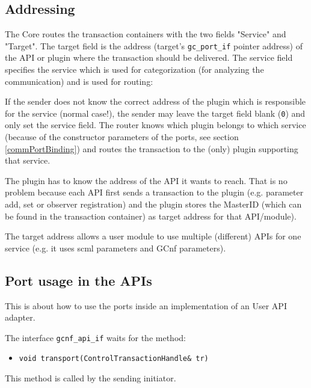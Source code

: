 \subsection{Addressing}
\label{commAddressing}
The \GreenControl Core routes the transaction containers with the two fields "Service" and "Target". The target field is the address (target's \lstinline|gc_port_if| pointer address) of the API or plugin where the transaction should be delivered. The service field specifies the service which is used for categorization (for analyzing the communication) and is used for routing:  

If the sender does not know the correct address of the plugin which is responsible for the service (normal case!), the sender may leave the target field blank (\lstinline|0|) and only set the service field. The router knows which plugin belongs to which service (because of the constructor parameters of the ports, see section \ref{commPortBinding}) and routes the transaction to the (only) plugin supporting that service. 

The plugin has to know the address of the API it wants to reach. That is no problem because each API first sends a transaction to the plugin (e.g. parameter add, set or observer registration) and the plugin stores the MasterID (which can be found in the transaction container) as target address for that API/module). 

The target address allows a user module to use multiple (different) APIs for one service (e.g. it uses scml parameters and GCnf parameters).  



\subsection{Port usage in the APIs}
This is about how to use the ports inside an implementation of an User API adapter. 

The interface \lstinline|gcnf_api_if| waits for the method: 

\begin{itemize}
\item \lstinline[language=TeX]|void transport(ControlTransactionHandle& tr)|
\end{itemize}

This method is called by the sending initiator.


